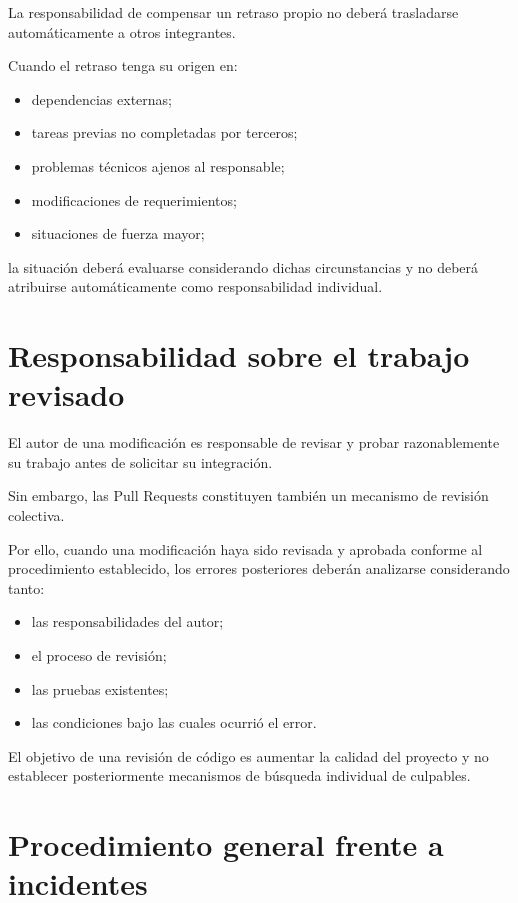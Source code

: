 \documentclass[12pt,a4paper]{article}
\begin{document}
La responsabilidad de compensar un retraso propio no deberá trasladarse automáticamente a otros integrantes.

Cuando el retraso tenga su origen en:

\begin{itemize}
    \item dependencias externas;
    \item tareas previas no completadas por terceros;
    \item problemas técnicos ajenos al responsable;
    \item modificaciones de requerimientos;
    \item situaciones de fuerza mayor;
\end{itemize}

la situación deberá evaluarse considerando dichas circunstancias y no deberá atribuirse automáticamente como responsabilidad individual.

\section{Responsabilidad sobre el trabajo revisado}

El autor de una modificación es responsable de revisar y probar razonablemente su trabajo antes de solicitar su integración.

Sin embargo, las Pull Requests constituyen también un mecanismo de revisión colectiva.

Por ello, cuando una modificación haya sido revisada y aprobada conforme al procedimiento establecido, los errores posteriores deberán analizarse considerando tanto:

\begin{itemize}
    \item las responsabilidades del autor;
    \item el proceso de revisión;
    \item las pruebas existentes;
    \item las condiciones bajo las cuales ocurrió el error.
\end{itemize}

El objetivo de una revisión de código es aumentar la calidad del proyecto y no establecer posteriormente mecanismos de búsqueda individual de culpables.

\section{Procedimiento general frente a incidentes}
\end{document}
